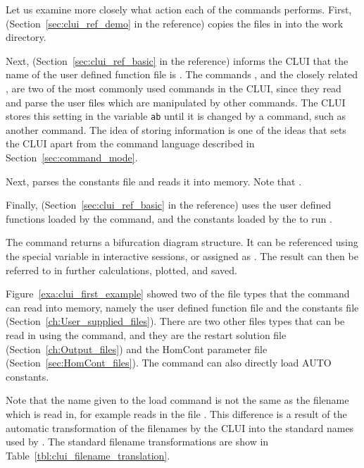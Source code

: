 \documentclass[12pt]{report}
\begin{document}
 Let us examine more closely what action each of the commands 
 performs.  First,  
 (Section~\ref{sec:clui_ref_demo} in the reference) copies the files in 
  into the work directory.  

 Next,  
 (Section~\ref{sec:clui_ref_basic} in the reference)
 informs the \AUTO CLUI that the name of
 the user defined function file is .  The commands
 , and the closely related , are
 two of the most commonly used commands in the
 \AUTO CLUI, since they read and parse the user files which are
 manipulated by other commands.  The \AUTO CLUI stores this setting in
 the variable {\tt ab} until it is changed by a command,
 such as another 
 command.  The idea of storing information is one of the ideas that
 sets the CLUI apart from the command language described in
 Section~\ref{sec:command_mode}.

 Next,  parses the \AUTO
 constants file  and reads it into memory.  Note that
 .  

 Finally,  
 (Section~\ref{sec:clui_ref_basic} in the reference)
 uses the user defined functions loaded
 by the  command, and the \AUTO constants
 loaded by the  to run \AUTO.

 The  command returns a bifurcation diagram structure. It can
 be referenced using the special \commandf{\_} variable in interactive
 sessions, or assigned as . The result
 can then be referred to in further calculations, plotted, and saved.

 Figure~\ref{exa:clui_first_example} showed two of 
 the file types that the 
  command can read into memory, namely 
 the user defined function file and the \AUTO constants
 file (Section~\ref{ch:User_supplied_files}).  
 There are two other files types that can be read
 in using the  command, and they are
 the restart solution file (Section~\ref{ch:Output_files})
 and the {\cal HomCont} parameter
 file (Section~\ref{sec:HomCont_files}). The  command
 can also directly load AUTO constants.

 Note that the name given to the load
 command is not the same as the filename which is read
 in, for example  reads in 
 the file .  This difference is 
 a result of the automatic transformation of the
 filenames by the 
 \AUTO CLUI into the
 standard names used by \AUTO.  
 The standard filename
 transformations are show in Table~\ref{tbl:clui_filename_translation}. 
\end{document}
